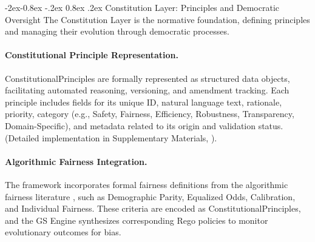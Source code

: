 \documentclass[manuscript,screen,9pt]{acmart}
\makeatletter
\renewcommand\subsubsection{\@startsection{subsubsection}{3}{\z@}%
  {-2ex\@plus -0.8ex \@minus -.2ex}%
  {0.8ex \@plus .2ex}%
  {\normalfont\normalsize\bfseries}}
\makeatother
\begin{document}
\subsubsection{Constitution Layer: Principles and Democratic Oversight}
\label{subsubsec:constitution_layer}
The Constitution Layer is the normative foundation, defining principles and managing their evolution through democratic processes.

\paragraph{Constitutional Principle Representation.} ConstitutionalPrinciples are formally represented as structured data objects, facilitating automated reasoning, versioning, and amendment tracking. Each principle includes fields for its unique ID, natural language text, rationale, priority, category (e.g., Safety, Fairness, Efficiency, Robustness, Transparency, Domain-Specific), and metadata related to its origin and validation status. (Detailed implementation in Supplementary Materials, ).

\paragraph{Algorithmic Fairness Integration.} The framework incorporates formal fairness definitions from the algorithmic fairness literature \cite{Barocas2023FairnessML, Hardt2016EqualityOpportunity, Chouldechova2017FairPrediction, Dwork2012DifferentialPrivacy}, such as Demographic Parity, Equalized Odds, Calibration, and Individual Fairness. These criteria are encoded as ConstitutionalPrinciples, and the GS Engine synthesizes corresponding Rego policies to monitor evolutionary outcomes for bias.
\end{document}
